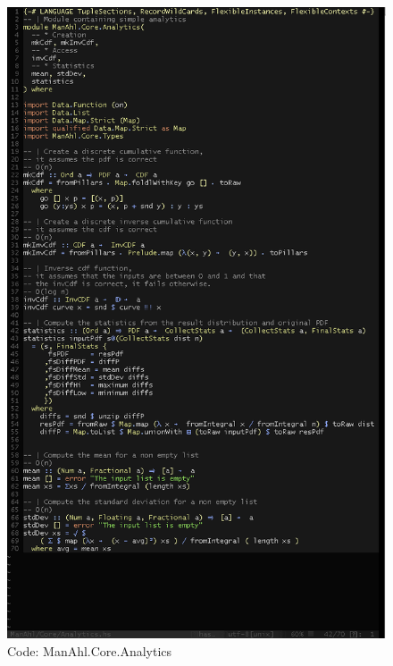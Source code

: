 \documentclass[12pt,a4paper,article]{memoir} %
\begin{document}
\begin{figure}[h!]
\centering
\includegraphics[width=1\textwidth]{img/code-analytics.png}
\caption{Code: ManAhl.Core.Analytics}
\label{fig:core.analytics}
\end{figure}
\end{document}

